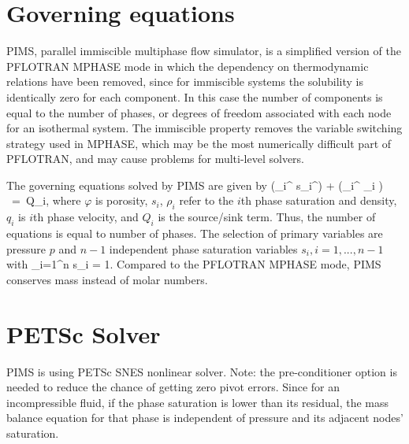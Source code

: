 \documentclass[12pt]{article}
\def\EQ#1\EN{\begin{equation}#1\end{equation}}
\newcommand{\eq}{\ =\ }
\newcommand{\p}{{\partial}}
\newcommand{\bnabla}{\boldsymbol{\nabla}}
\newcommand{\bq}{\boldsymbol{q}}
\begin{document}
\normalsize

\clearpage

\tableofcontents

\listoffigures

\listoftables

\clearpage




\section{Governing equations}

PIMS, parallel immiscible multiphase flow simulator, is a simplified version of the PFLOTRAN MPHASE mode in which the dependency on thermodynamic relations have been removed, since for immiscible systems the solubility is identically zero for each component. In this case the number of components is equal to the number of phases, or degrees of freedom associated with each node for an isothermal system. The immiscible property removes the variable switching strategy used in MPHASE, which may be the most numerically difficult part of PFLOTRAN, and may cause problems for multi-level solvers. 

The governing equations solved by PIMS are given by
\EQ\label{mass}
\frac{\p}{\p t}\big(\varphi\rho_i^{} s_i^{}\big) + \bnabla\cdot \big(\rho_i^{} \bq_i \big) \eq Q_i,
\EN
where $\varphi$ is porosity, $s_i$, $\rho_i$ refer to the $i$th phase saturation and density, $q_i$ is $i$th phase velocity, and $Q_i$ is the source/sink term. Thus, the number of equations is equal to number of phases. 
The selection of primary variables are pressure $p$ and $n\!-\!1$ independent phase saturation variables $s_i, i=1,...,n\!-\!1$ with
\EQ
\sum_{i=1}^n s_i = 1.
\EN
Compared to the PFLOTRAN MPHASE mode, PIMS conserves mass instead of molar numbers. 

\section{PETSc Solver}
PIMS is using PETSc SNES nonlinear solver. 
Note: the pre-conditioner option  is needed to reduce the chance of getting zero pivot errors. Since for an incompressible fluid, if the phase saturation is lower than its residual, the mass balance equation for that phase is independent of pressure and its adjacent nodes' saturation. 
\end{document}
